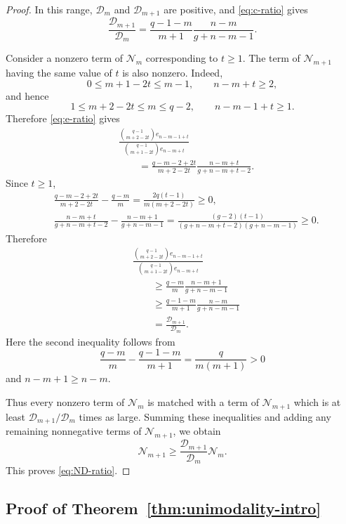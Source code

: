\documentclass[12pt]{amsart}
\theoremstyle{plain}
\theoremstyle{definition}
\theoremstyle{remark}
\begin{document}
\begin{proof}
In this range, \(\mathcal D_m\) and \(\mathcal D_{m+1}\) are positive,
and \eqref{eq:c-ratio} gives
\[
 \frac{\mathcal D_{m+1}}{\mathcal D_m}
 =
 \frac{q-1-m}{m+1}
 \frac{n-m}{g+n-m-1}.
\]

Consider a nonzero term of \(\mathcal N_m\) corresponding to \(t\ge1\).
The term of \(\mathcal N_{m+1}\) having the same value of \(t\) is also
nonzero.  Indeed,
\[
 0\le m+1-2t\le m-1,
 \qquad
 n-m+t\ge2,
\]
and hence
\[
 1\le m+2-2t\le m\le q-2,
 \qquad
 n-m-1+t\ge1.
\]
Therefore \eqref{eq:e-ratio} gives
\begin{align*}
 &\frac{\binom{q-1}{m+2-2t}e_{n-m-1+t}}
 {\binom{q-1}{m+1-2t}e_{n-m+t}}\\
 &\qquad=
 \frac{q-m-2+2t}{m+2-2t}
 \frac{n-m+t}{g+n-m+t-2}.
\end{align*}
Since \(t\ge1\),
\begin{align*}
 &\frac{q-m-2+2t}{m+2-2t}-\frac{q-m}{m}
 =
 \frac{2q(t-1)}{m(m+2-2t)}
 \ge0,\\
 &\frac{n-m+t}{g+n-m+t-2}
 -\frac{n-m+1}{g+n-m-1}
 =
 \frac{(g-2)(t-1)}
 {(g+n-m+t-2)(g+n-m-1)}
 \ge0.
\end{align*}
Therefore
\begin{align*}
 &\frac{\binom{q-1}{m+2-2t}e_{n-m-1+t}}
 {\binom{q-1}{m+1-2t}e_{n-m+t}}\\
 &\qquad\ge
 \frac{q-m}{m}
 \frac{n-m+1}{g+n-m-1}\\
 &\qquad\ge
 \frac{q-1-m}{m+1}
 \frac{n-m}{g+n-m-1}\\
 &\qquad=
 \frac{\mathcal D_{m+1}}{\mathcal D_m}.
\end{align*}
Here the second inequality follows from
\[
 \frac{q-m}{m}-\frac{q-1-m}{m+1}
 =\frac{q}{m(m+1)}>0
\]
and \(n-m+1\ge n-m\).

Thus every nonzero term of \(\mathcal N_m\) is matched with a term of
\(\mathcal N_{m+1}\) which is at least
\(\mathcal D_{m+1}/\mathcal D_m\) times as large.  Summing these
inequalities and adding any remaining nonnegative terms of
\(\mathcal N_{m+1}\), we obtain
\[
 \mathcal N_{m+1}
 \ge
 \frac{\mathcal D_{m+1}}{\mathcal D_m}\mathcal N_m.
\]
This proves \eqref{eq:ND-ratio}.
\end{proof}

\subsection{Proof of Theorem~\ref{thm:unimodality-intro}}
\end{document}
